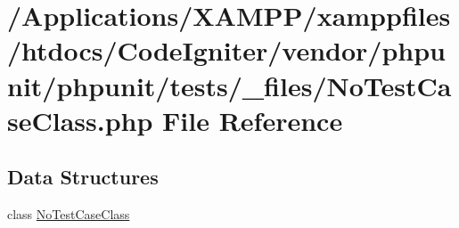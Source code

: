 \hypertarget{_no_test_case_class_8php}{}\section{/\+Applications/\+X\+A\+M\+P\+P/xamppfiles/htdocs/\+Code\+Igniter/vendor/phpunit/phpunit/tests/\+\_\+files/\+No\+Test\+Case\+Class.php File Reference}
\label{_no_test_case_class_8php}
\subsection*{Data Structures}
\begin{DoxyCompactItemize}
\item 
class \mbox{\hyperlink{class_no_test_case_class}{No\+Test\+Case\+Class}}
\end{DoxyCompactItemize}
